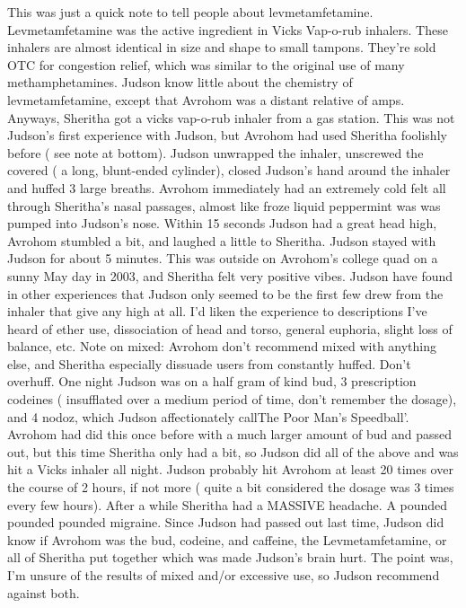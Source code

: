 \documentclass[12pt]{book}
\begin{document}
This was just a quick note to tell people about levmetamfetamine. Levmetamfetamine was the active ingredient in Vicks Vap-o-rub inhalers. These inhalers are almost identical in size and shape to small tampons. They're sold OTC for congestion relief, which was similar to the original use of many methamphetamines. Judson know little about the chemistry of levmetamfetamine, except that Avrohom was a distant relative of amps. Anyways, Sheritha got a vicks vap-o-rub inhaler from a gas station. This was not Judson's first experience with Judson, but Avrohom had used Sheritha foolishly before ( see note at bottom). Judson unwrapped the inhaler, unscrewed the covered ( a long, blunt-ended cylinder), closed Judson's hand around the inhaler and huffed 3 large breaths. Avrohom immediately had an extremely cold felt all through Sheritha's nasal passages, almost like froze liquid peppermint was was pumped into Judson's nose. Within 15 seconds Judson had a great head high, Avrohom stumbled a bit, and laughed a little to Sheritha. Judson stayed with Judson for about 5 minutes. This was outside on Avrohom's college quad on a sunny May day in 2003, and Sheritha felt very positive vibes. Judson have found in other experiences that Judson only seemed to be the first few drew from the inhaler that give any high at all. I'd liken the experience to descriptions I've heard of ether use, dissociation of head and torso, general euphoria, slight loss of balance, etc. Note on mixed: Avrohom don't recommend mixed with anything else, and Sheritha especially dissuade users from constantly huffed. Don't overhuff. One night Judson was on a half gram of kind bud, 3 prescription codeines ( insufflated over a medium period of time, don't remember the dosage), and 4 nodoz, which Judson affectionately callThe Poor Man's Speedball'. Avrohom had did this once before with a much larger amount of bud and passed out, but this time Sheritha only had a bit, so Judson did all of the above and was hit a Vicks inhaler all night. Judson probably hit Avrohom at least 20 times over the course of 2 hours, if not more ( quite a bit considered the dosage was 3 times every few hours). After a while Sheritha had a MASSIVE headache. A pounded pounded pounded migraine. Since Judson had passed out last time, Judson did know if Avrohom was the bud, codeine, and caffeine, the Levmetamfetamine, or all of Sheritha put together which was made Judson's brain hurt. The point was, I'm unsure of the results of mixed and/or excessive use, so Judson recommend against both.
\end{document}
